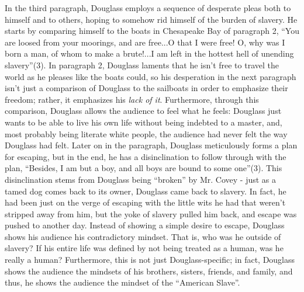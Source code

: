 \documentclass[11pt]{scrartcl}
\begin{document}
In the third paragraph, Douglass employs a sequence of desperate pleas both to himself and to others, hoping to somehow rid himself of the burden of slavery. He starts by comparing himself to the boats in Chesapeake Bay of paragraph 2, \enquote{You are loosed from your moorings, and are free...O that I were free! O, why was I born a man, of whom to make a brute!...I am left in the hottest hell of unending slavery}(3). In paragraph 2, Douglass laments that he isn't free to travel the world as he pleases like the boats could, so his desperation in the next paragraph isn't just a comparison of Douglass to the sailboats in order to emphasize their freedom; rather, it emphasizes his \textit{lack of it}. Furthermore, through this comparison, Douglass allows the audience to feel what he feels: Douglass just wants to be able to live his own life without being indebted to a master, and, most probably being literate white people, the audience had never felt the way Douglass had felt. Later on in the paragraph, Douglass meticulously forms a plan for escaping, but in the end, he has a disinclination to follow through with the plan, \enquote{Besides, I am but a boy, and all boys are bound to some one}(3). This disinclination stems from Douglass being \enquote{broken} by Mr. Covey - just as a tamed dog comes back to its owner, Douglass came back to slavery. In fact, he had been just on the verge of escaping with the little wits he had that weren't stripped away from him, but the yoke of slavery pulled him back, and escape was pushed to another day. Instead of showing a simple desire to escape, Douglass shows his audience his contradictory mindset. That is, who was he outside of slavery? If his entire life was defined by not being treated as a human, was he really a human? Furthermore, this is not just Douglass-specific; in fact, Douglass shows the audience the mindsets of his brothers, sisters, friends, and family, and thus, he shows the audience the mindset of the \enquote{American Slave}.
\end{document}
